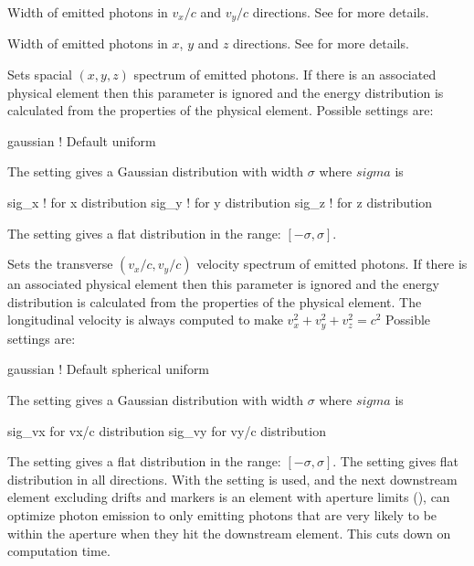 {\begin{description}
  \item[\vn{sig_vx, sig_vy}] \Newline
Width of emitted photons in $v_x/c$ and $v_y/c$ directions. See
 for more details.

  \item[\vn{sig_x, sig_y, sig_z}] \Newline
Width of emitted photons in $x$, $y$ and $z$ directions. See
 for more details.

  \item[\vn{spatial_distribution}] \Newline
Sets spacial $(x, y, z)$ spectrum of emitted photons. If there is an associated physical element
then this parameter is ignored and the energy distribution is calculated from the properties of the
physical element. Possible settings are:
\begin{example}
  gaussian    ! Default
  uniform
\end{example}
The  setting gives a Gaussian distribution with width
$\sigma$ where $sigma$ is 
\begin{example}
  sig_x     ! for x distribution
  sig_y     ! for y distribution
  sig_z     ! for z distribution
\end{example}
The  setting gives a flat
distribution in the range: $[-\sigma, \sigma]$.

  \item[\vn{velocity_distribution}] \Newline
Sets the transverse $(v_x/c, v_y/c)$ velocity spectrum of emitted photons. If there is an associated
physical element then this parameter is ignored and the energy distribution is calculated from the
properties of the physical element. The longitudinal velocity is always computed to make $v_x^2 +
v_y^2 + v_z^2 = c^2$ Possible settings are:
\begin{example}
  gaussian    ! Default
  spherical
  uniform
\end{example}
The  setting gives a Gaussian distribution with width
$\sigma$ where $sigma$ is 
\begin{example}
  sig_vx     for vx/c distribution
  sig_vy     for vy/c distribution
\end{example}
The  setting gives a flat distribution in the range: $[-\sigma, \sigma]$. The
 setting gives flat distribution in all directions. With the 
setting is used, and the next downstream element excluding drifts and markers is an element
with aperture limits (), \bmad can optimize photon emission to only emitting 
photons that are very likely to be within the aperture when they hit the downstream element.
This cuts down on computation time.


\end{description}}
